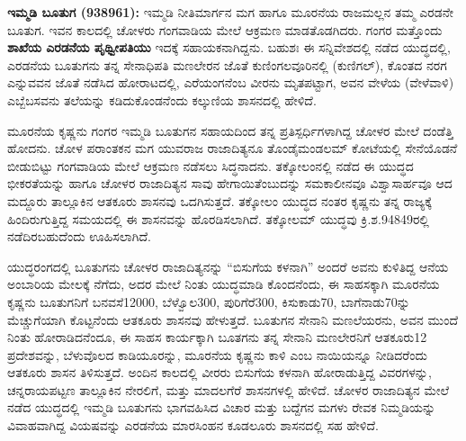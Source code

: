 \textbf{ ಇಮ್ಮಡಿ ಬೂತುಗ (938\general{\enginline{-}}961):} ಇಮ್ಮಡಿ ನೀತಿಮಾರ್ಗನ ಮಗ ಹಾಗೂ ಮೂರನೆಯ ರಾಜಮಲ್ಲನ ತಮ್ಮ ಎರಡನೇ ಬೂತುಗ. ಇವನ ಕಾಲದಲ್ಲಿ ಚೋಳರು ಗಂಗವಾಡಿಯ ಮೇಲೆ ಆಕ್ರಮಣ ಮಾಡತೊಡಗಿದರು. ಗಂಗರ ಮತ್ತೊಂದು \textbf{ಶಾಖೆಯ ಎರಡನೆಯ ಪೃಥ್ವೀಪತಿಯು} ಇದಕ್ಕೆ ಸಹಾಯಕನಾಗಿದ್ದನು. ಬಹುಶಃ ಈ ಸನ್ನಿವೇಶದಲ್ಲಿ ನಡೆದ ಯುದ್ಧದಲ್ಲಿ, ಎರಡನೆಯ ಬೂತುಗನು ತನ್ನ ಸೇನಾಧಿಪತಿ ಮಣಲೇರನ ಜೊತೆ ಕುಣಿಂಗಲವೂರಿನಲ್ಲಿ (ಕುಣಿಗಲ್​), ಕೊಂತದ ನರಗ ಎನ್ನುವವನ ಜೊತೆ ನಡೆಸಿದ ಹೋರಾಟದಲ್ಲಿ, ಎರೆಯಂಗನೆಂಬ ವೀರನು ಮೃತಪಟ್ಟಾಗ, ಅವನ ವೇಳೆಯ (ವೇಳೆವಾಳಿ) ಎಬ್ಬೆಬಸವನು ತಲೆಯನ್ನು ಕಡಿದುಕೊಂಡನೆಂದು ಕಲ್ಕುಣಿಯ ಶಾಸನದಲ್ಲಿ ಹೇಳಿದೆ.

ಮೂರನೆಯ ಕೃಷ್ಣನು ಗಂಗರ ಇಮ್ಮಡಿ ಬೂತುಗನ ಸಹಾಯದಿಂದ ತನ್ನ ಪ್ರತಿಸ್ಪರ್ಧಿಗಳಾಗಿದ್ದ ಚೋಳರ ಮೇಲೆ ದಂಡೆತ್ತಿ ಹೋದನು. ಚೋಳ ಪರಾಂತಕನ ಮಗ ಯುವರಾಜ ರಾಜಾದಿತ್ಯನೂ ತೊಂಡೈಮಂಡಲಮ್ ಕೋಟೆಯಲ್ಲಿ ಸೇನೆಯೊಡನೆ ಬೀಡುಬಿಟ್ಟು ಗಂಗವಾಡಿಯ ಮೇಲೆ ಆಕ್ರಮಣ ನಡೆಸಲು ಸಿದ್ಧನಾದನು. ತಕ್ಕೋಲಂನಲ್ಲಿ ನಡೆದ ಈ ಯುದ್ಧದ ಭೀಕರತೆಯನ್ನು ಹಾಗೂ ಚೋಳರ ರಾಜಾದಿತ್ಯನ ಸಾವು ಹೇಗಾಯಿತೆಂಬುದನ್ನು ಸಮಕಾಲೀನವೂ ವಿಶ್ವಾಸಾರ್ಹವೂ ಆದ ಮದ್ದೂರು ತಾಲ್ಲೂಕಿನ ಆತಕೂರು ಶಾಸನವು ಒದಗಿಸುತ್ತದೆ. ತಕ್ಕೋಲಂ ಯುದ್ಧದ ನಂತರ ಕೃಷ್ಣನು ತನ್ನ ರಾಜ್ಯಕ್ಕೆ ಹಿಂದಿರುಗುತ್ತಿದ್ದ ಸಮಯದಲ್ಲಿ ಈ ಶಾಸನವನ್ನು ಹೊರಡಿಸಲಾಗಿದೆ. ತಕ್ಕೋಲಮ್ ಯುದ್ಧವು ಕ್ರಿ.ಶ.948\enginline{-}49ರಲ್ಲಿ ನಡೆದಿರಬಹುದೆಂದು ಊಹಿಸಲಾಗಿದೆ.

ಯುದ್ಧರಂಗದಲ್ಲಿ ಬೂತುಗನು ಚೋಳರ ರಾಜಾದಿತ್ಯನನ್ನು “ಬಿಸುಗೆಯ ಕಳನಾಗಿ” ಅಂದರೆ ಅವನು ಕುಳಿತಿದ್ದ ಆನೆಯ ಅಂಬಾರಿಯ ಮೇಲಕ್ಕೆ ನೆಗೆದು, ಅದರ ಮೇಲೆ ನಿಂತು ಯುದ್ಧಮಾಡಿ ಕೊಂದನೆಂದು, ಈ ಸಾಹಸಕ್ಕಾಗಿ ಮೂರನೆಯ ಕೃಷ್ಣನು ಬೂತುಗನಿಗೆ ಬನವಸೆ\enginline{-}12000, ಬೆಳ್ವೊಲ\enginline{-}300, ಪುರಿಗೆರೆ\enginline{-}300, ಕಿಸುಕಾಡು\enginline{-}70, ಬಾಗೆನಾಡು\enginline{-}70ನ್ನು ಮೆಚ್ಚುಗೆಯಾಗಿ ಕೊಟ್ಟನೆಂದು ಆತಕೂರು ಶಾಸನವು ಹೇಳುತ್ತದೆ. ಬೂತುಗನ ಸೇನಾನಿ ಮಣಲೆಯರನು, ಅವನ ಮುಂದೆ ನಿಂತು ಹೋರಾಡಿದನೆಂದೂ, ಈ ಸಾಹಸ ಕಾರ್ಯಕ್ಕಾಗಿ ಬೂತಗನು ತನ್ನ ಸೇನಾನಿ ಮಣಲೇರನಿಗೆ ಆತಕೂರು\enginline{-}12 ಪ್ರದೇಶವನ್ನು, ಬೆಳುವೊಲದ ಕಾಡಿಯೂರನ್ನು, ಮೂರನೆಯ ಕೃಷ್ಣನು ಕಾಳಿ ಎಂಬ ನಾಯಿಯನ್ನೂ ನೀಡಿದರೆಂದು ಆತಕೂರು ಶಾಸನ ತಿಳಿಸುತ್ತದೆ. ಅಂದಿನ ಕಾಲದಲ್ಲಿ ವೀರರು ಬಿಸುಗೆಯ ಕಳನಾಗಿ ಹೋರಾಡುತ್ತಿದ್ದ ವಿವರಗಳನ್ನು, ಚನ್ನರಾಯಪಟ್ಟಣ ತಾಲ್ಲೂಕಿನ ನೇರಲಿಗೆ, ಮತ್ತು ಮಾದಲಗೆರೆ ಶಾಸನಗಳಲ್ಲಿ ಹೇಳಿದೆ. ಚೋಳರ ರಾಜಾದಿತ್ಯನ ಮೇಲೆ ನಡೆದ ಯುದ್ಧದಲ್ಲಿ ಇಮ್ಮಡಿ ಬೂತುಗನು ಭಾಗವಹಿಸಿದ ವಿಚಾರ ಮತ್ತು ಬದ್ದೆಗನ ಮಗಳು ರೇವಕ ನಿಮ್ಮಡಿಯನ್ನು ವಿವಾಹವಾಗಿದ್ದ ವಿಯಷವನ್ನು ಎರಡನೆಯ ಮಾರಸಿಂಹನ ಕೂಡಲೂರು ಶಾಸನದಲ್ಲಿ ಸಹ ಹೇಳಿದೆ.


